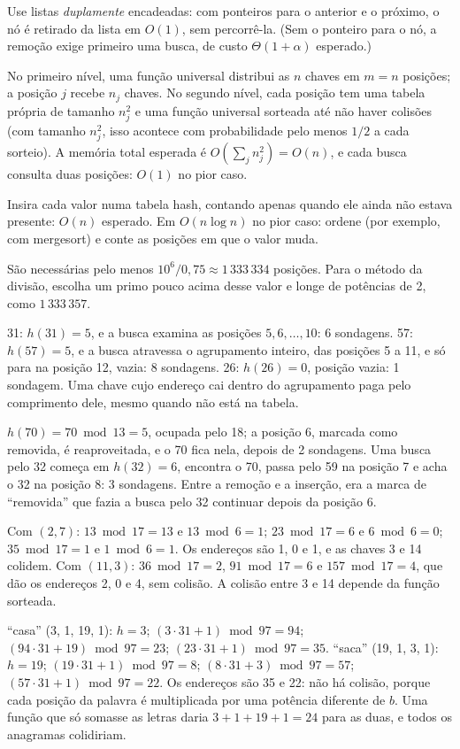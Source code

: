 Use listas \emph{duplamente} encadeadas: com ponteiros para o anterior e o próximo, o nó é retirado da lista em $O(1)$, sem percorrê-la. (Sem o ponteiro para o nó, a remoção exige primeiro uma busca, de custo $\Theta(1+\alpha)$ esperado.)

 No primeiro nível, uma função universal distribui as $n$ chaves em $m=n$ posições; a posição $j$ recebe $n_j$ chaves. No segundo nível, cada posição tem uma tabela própria de tamanho $n_j^2$ e uma função universal sorteada até não haver colisões (com tamanho $n_j^2$, isso acontece com probabilidade pelo menos $1/2$ a cada sorteio). A memória total esperada é $O(\sum_jn_j^2)=O(n)$, e cada busca consulta duas posições: $O(1)$ no pior caso.

 Insira cada valor numa tabela hash, contando apenas quando ele ainda não estava presente: $O(n)$ esperado. Em $O(n\log n)$ no pior caso: ordene (por exemplo, com mergesort) e conte as posições em que o valor muda.

 São necessárias pelo menos $10^6/0{,}75\approx1\,333\,334$ posições. Para o método da divisão, escolha um primo pouco acima desse valor e longe de potências de 2, como $1\,333\,357$.

 31: $h(31)=5$, e a busca examina as posições $5,6,\dots,10$: 6 sondagens. 57: $h(57)=5$, e a busca atravessa o agrupamento inteiro, das posições 5 a 11, e só para na posição 12, vazia: 8 sondagens. 26: $h(26)=0$, posição vazia: 1 sondagem. Uma chave cujo endereço cai dentro do agrupamento paga pelo comprimento dele, mesmo quando não está na tabela.

 $h(70)=70\bmod13=5$, ocupada pelo 18; a posição 6, marcada como removida, é reaproveitada, e o 70 fica nela, depois de 2 sondagens. Uma busca pelo 32 começa em $h(32)=6$, encontra o 70, passa pelo 59 na posição 7 e acha o 32 na posição 8: 3 sondagens. Entre a remoção e a inserção, era a marca de ``removida'' que fazia a busca pelo 32 continuar depois da posição 6.

 Com $(2,7)$: $13\bmod17=13$ e $13\bmod6=1$; $23\bmod17=6$ e $6\bmod6=0$; $35\bmod17=1$ e $1\bmod6=1$. Os endereços são 1, 0 e 1, e as chaves 3 e 14 colidem. Com $(11,3)$: $36\bmod17=2$, $91\bmod17=6$ e $157\bmod17=4$, que dão os endereços 2, 0 e 4, sem colisão. A colisão entre 3 e 14 depende da função sorteada.

 ``casa'' (3, 1, 19, 1): $h=3$; $(3\cdot31+1)\bmod97=94$; $(94\cdot31+19)\bmod97=23$; $(23\cdot31+1)\bmod97=35$. ``saca'' (19, 1, 3, 1): $h=19$; $(19\cdot31+1)\bmod97=8$; $(8\cdot31+3)\bmod97=57$; $(57\cdot31+1)\bmod97=22$. Os endereços são 35 e 22: não há colisão, porque cada posição da palavra é multiplicada por uma potência diferente de $b$. Uma função que só somasse as letras daria $3+1+19+1=24$ para as duas, e todos os anagramas colidiriam.
